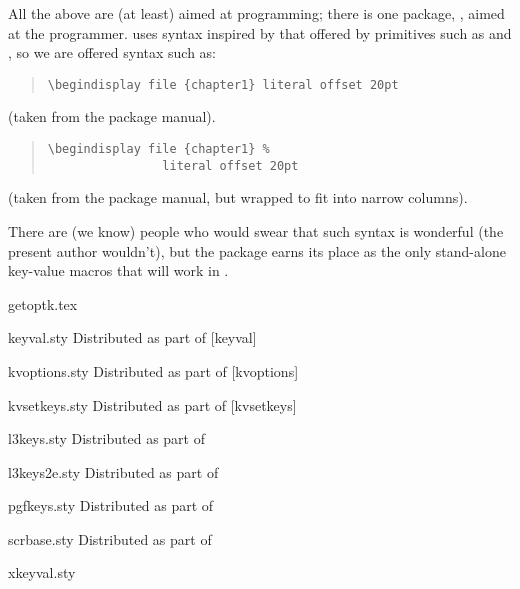 All the above are (at least) aimed at \latex{} programming; there is
one package, , aimed at the \plaintex{} programmer.
 uses syntax inspired by that offered by \tex{}
primitives such as  and , so we are offered
syntax such as:
\begin{wideversion}
\begin{quote}
\begin{verbatim}
\begindisplay file {chapter1} literal offset 20pt
\end{verbatim}
\end{quote}
(taken from the package manual).
\end{wideversion}
\begin{narrowversion}
\begin{quote}
\begin{verbatim}
\begindisplay file {chapter1} %
                literal offset 20pt
\end{verbatim}
\end{quote}
(taken from the package manual, but wrapped to fit into narrow
columns).
\end{narrowversion}

There are (we know) people who would swear that such syntax is
wonderful (the present author wouldn't), but the package earns its
place as the only stand-alone key-value macros that will work in \plaintex{}.
\begin{ctanrefs}
\item[getoptk.tex]
\item[keyval.sty]Distributed as part of [keyval]
\item[kvoptions.sty]Distributed as part of [kvoptions]
\item[kvsetkeys.sty]Distributed as part of [kvsetkeys]
\item[l3keys.sty]Distributed as part of 
\item[l3keys2e.sty]Distributed as part of 
\item[pgfkeys.sty]Distributed as part of 
\item[scrbase.sty]Distributed as part of 
\item[xkeyval.sty]
\end{ctanrefs}


